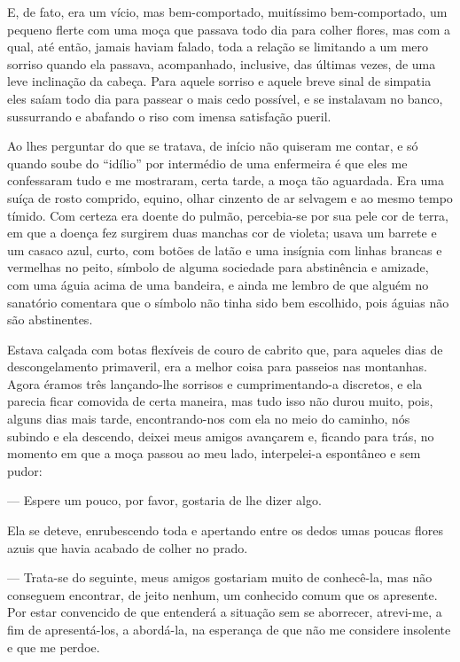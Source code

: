 E, de fato, era um vício, mas bem-comportado, muitíssimo bem-comportado,
um pequeno flerte com uma moça que passava todo dia para colher flores,
mas com a qual, até então, jamais haviam falado, toda a relação se
limitando a um mero sorriso quando ela passava, acompanhado, inclusive,
das últimas vezes, de uma leve inclinação da cabeça. Para aquele sorriso
e aquele breve sinal de simpatia eles saíam todo dia para passear o mais
cedo possível, e se instalavam no banco, sussurrando e abafando o riso
com imensa satisfação pueril.

Ao lhes perguntar do que se tratava, de início não quiseram me contar, e
só quando soube do ``idílio'' por intermédio de uma enfermeira é que
eles me confessaram tudo e me mostraram, certa tarde, a moça tão
aguardada. Era uma suíça de rosto comprido, equino, olhar cinzento de ar
selvagem e ao mesmo tempo tímido. Com certeza era doente do pulmão,
percebia-se por sua pele cor de terra, em que a doença fez surgirem duas
manchas cor de violeta; usava um barrete e um casaco azul, curto, com
botões de latão e uma insígnia com linhas brancas e vermelhas no peito,
símbolo de alguma sociedade para abstinência e amizade, com uma águia
acima de uma bandeira, e ainda me lembro de que alguém no sanatório
comentara que o símbolo não tinha sido bem escolhido, pois águias não
são abstinentes.

Estava calçada com botas flexíveis de couro de cabrito que, para aqueles
dias de descongelamento primaveril, era a melhor coisa para passeios nas
montanhas. Agora éramos três lançando-lhe sorrisos e cumprimentando-a
discretos, e ela parecia ficar comovida de certa maneira, mas tudo isso
não durou muito, pois, alguns dias mais tarde, encontrando-nos com ela
no meio do caminho, nós subindo e ela descendo, deixei meus amigos
avançarem e, ficando para trás, no momento em que a moça passou ao meu
lado, interpelei-a espontâneo e sem pudor:

--- Espere um pouco, por favor, gostaria de lhe dizer algo.

Ela se deteve, enrubescendo toda e apertando entre os dedos umas poucas
flores azuis que havia acabado de colher no prado.

--- Trata-se do seguinte, meus amigos gostariam muito de conhecê-la, mas
não conseguem encontrar, de jeito nenhum, um conhecido comum que os
apresente. Por estar convencido de que entenderá a situação sem se
aborrecer, atrevi-me, a fim de apresentá-los, a abordá-la, na esperança
de que não me considere insolente e que me perdoe.

